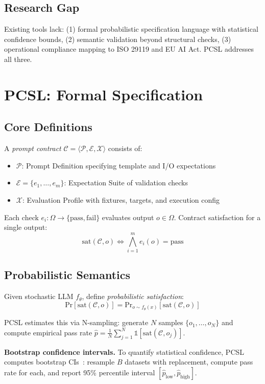 \documentclass[sigconf]{acmart}
\begin{document}
\subsection{Research Gap}

Existing tools lack: (1) formal probabilistic specification language with statistical confidence bounds, (2) semantic validation beyond structural checks, (3) operational compliance mapping to ISO 29119 and EU AI Act. PCSL addresses all three.

\section{PCSL: Formal Specification}

\subsection{Core Definitions}

A \textit{prompt contract} \( \mathcal{C} = \langle \mathcal{P}, \mathcal{E}, \mathcal{X} \rangle \) consists of:
\begin{itemize}
\item \( \mathcal{P} \): Prompt Definition specifying template and I/O expectations
\item \( \mathcal{E} = \{e_1, \ldots, e_m\} \): Expectation Suite of validation checks
\item \( \mathcal{X} \): Evaluation Profile with fixtures, targets, and execution config
\end{itemize}

Each check \( e_i: \Omega \to \{\text{pass}, \text{fail}\} \) evaluates output \( o \in \Omega \). Contract satisfaction for a single output:
\[
\text{sat}(\mathcal{C}, o) \iff \bigwedge_{i=1}^{m} e_i(o) = \text{pass}
\]

\subsection{Probabilistic Semantics}

Given stochastic LLM \( f_\theta \), define \textit{probabilistic satisfaction}:
\[
\text{Pr}[\text{sat}(\mathcal{C}, o)] = \text{Pr}_{o \sim f_\theta(x)}[\text{sat}(\mathcal{C}, o)]
\]

PCSL estimates this via N-sampling: generate \( N \) samples \( \{o_1, \ldots, o_N\} \) and compute empirical pass rate \( \hat{p} = \frac{1}{N}\sum_{j=1}^N \mathbb{1}[\text{sat}(\mathcal{C}, o_j)] \).

\textbf{Bootstrap confidence intervals.} To quantify statistical confidence, PCSL computes bootstrap CIs~\cite{efron1994bootstrap}: resample \( B \) datasets with replacement, compute pass rate for each, and report 95\% percentile interval \( [\hat{p}_{\text{low}}, \hat{p}_{\text{high}}] \).
\end{document}
